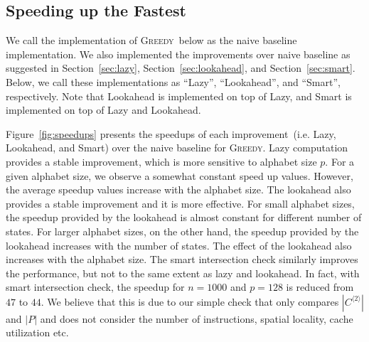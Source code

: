 \documentclass[12pt]{article}
\newcommand{\comment}[2]{{\color{red}{\bf (#1: #2)}}}
\newcommand{\greedyAlgo}{\textsc{Greedy}}
\begin{document}
\subsection{Speeding up the Fastest}

We call the implementation of \greedyAlgo\ below as the naive baseline implementation. We also implemented the improvements over naive baseline as suggested in Section~\ref{sec:lazy}, Section~\ref{sec:lookahead}, and Section~\ref{sec:smart}. Below, we call these implementations as ``Lazy'', ``Lookahead'', and ``Smart'', respectively. Note that Lookahead is implemented on top of Lazy, and Smart is implemented on top of Lazy and Lookahead.


Figure~\ref{fig:speedups} presents the speedups of each improvement~(i.e. Lazy,  Lookahead, and Smart) over the naive baseline for \greedyAlgo . Lazy computation provides a stable improvement, which is more sensitive to alphabet size $p$. For a given alphabet size, we observe a somewhat constant speed up values. However, the average speedup values increase with the alphabet size. The lookahead also provides a stable improvement and it is more effective. For small alphabet sizes, the speedup provided by the lookahead is almost constant for different number of states. For larger alphabet sizes, on the other hand, the speedup provided by the lookahead increases with the number of states. The effect of the lookahead also increases with the alphabet size. The smart intersection check similarly improves the performance, but not to the same extent as lazy and lookahead. In fact, with smart intersection check, the speedup for $n = 1000$ and $p = 128$ is reduced from $47$ to $44$. We believe that this is due to our simple check that only compares $|C^{\langle 2 \rangle}|$ and $|P|$  and does not consider the number of instructions, spatial locality, cache utilization etc.\comment{sertac}{state sayisi 1000 olanlar buraya kadar hic yok burada dahil etmeli miyiz?}
\end{document}

